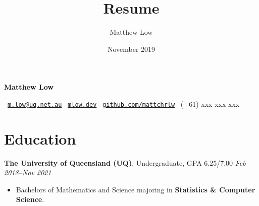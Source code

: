 \documentclass[9pt, a4paper]{extarticle}
\title{Resume}
\author{Matthew Low}
\date{November 2019}
\begin{document}

\begin{center}
\Huge{\sffamily\textbf{\color{black} Matthew Low}}\normalsize

\Letter \ \href{mailto:m.low@uq.net.au}{\nolinkurl{m.low@uq.net.au}} \quad \ComputerMouse \ \href{https://mlow.dev}{\nolinkurl{mlow.dev}} \quad \faGithub \ \href{https://github.com/mattchrlw}{\nolinkurl{github.com/mattchrlw}} \quad \Telefon \ (+61) xxx xxx xxx
\end{center}



\section*{Education}



\textbf{The University of Queensland (UQ)}, Undergraduate, GPA 6.25/7.00
\hfill \textit{Feb 2018--Nov 2021}
\begin{itemize}[label=\textcolor{gray!80}{\textbullet}]
\item Bachelors of Mathematics and Science majoring in \textbf{Statistics \& Computer Science}.
\end{itemize}

\end{document}
